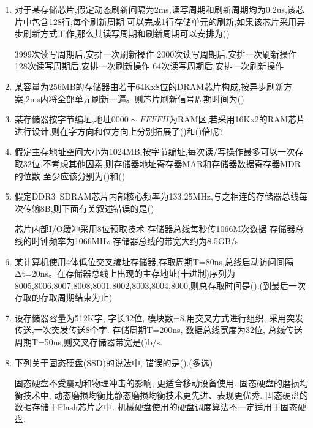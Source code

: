 \documentclass[12pt, a4paper, oneside, UTF8]{ctexbook}
\begin{document}
\begin{enumerate}
    \item  对于某存储芯片,假定动态刷新间隔为2ms,读写周期和刷新周期均为0.2us,该芯片中包含128行,每个刷新周期
    可以完成1行存储单元的刷新,如果该芯片采用异步刷新方式工作,那么其读写周期和刷新周期可以安排为(\qquad)

    \begin{choices}[1]
        \task 3999次读写周期后,安排一次刷新操作
        \task  2000次读写周期后,安排一次刷新操作
        \task 128次读写周期后,安排一次刷新操作
        \task 64次读写周期后,安排一次刷新操作
    \end{choices}

    \item 某容量为256MB的存储器由若干64Kx8位的DRAM芯片构成,按异步刷新方案,2ms内将全部单元刷新一遍。则芯片刷新信号周期时间为(\qquad)
    \item 某存储器按字节编址,地址$0000\sim FFFFH$为RAM区,若采用16Kx2的RAM芯片进行设计,则在字方向和位方向上分别拓展了(\qquad)和(\qquad)倍呢?
    \item 假定主存地址空间大小为1024MB,按字节编址,每次读/写操作最多可以一次存取32位.不考虑其他因素,则存储器地址寄存器MAR和存储器数据寄存器MDR的位数
    至少应该分别为(\qquad)和(\qquad)
    \item 假定DDR3\ SDRAM芯片内部核心频率为133.25MHz,与之相连的存储器总线每次传输8B,则下面有关叙述错误的是(\qquad)
    \begin{choices}[1]
        \task 芯片内部I/O缓冲采用8位预取技术
        \task 存储器总线每秒传1066M次数据
        \task 存储器总线的时钟频率为1066MHz
        \task 存储器总线的带宽大约为8.5GB/s
    \end{choices}
    \item 某计算机使用4体低位交叉编址存储器,存取周期T=80ns,总线启动访问间隔Δt=20ns。在存储器总线上出现的主存地址(十进制)序列为
    8005,8006,8007,8008,8001,8002,8003,8004,8000,则总存取时间是(\qquad).(到最后一次存取的存取周期结束为止)

    \item 设存储器容量为512K字, 字长32位, 模块数=8,用交叉方式进行组织, 采用突发传送,一次突发传送8个字. 存储周期T=200ns,
    数据总线宽度为32位, 总线传送周期T=50ns,则交叉存储器带宽是(\qquad)b/s.

    \item 下列关于固态硬盘(SSD)的说法中, 错误的是(\qquad).(多选)
    \begin{choices}[1]
        \task 固态硬盘不受震动和物理冲击的影响, 更适合移动设备使用.
        \task 固态硬盘的磨损均衡技术中, 动态磨损均衡比静态磨损均衡技术更先进、表现更优秀.
        \task 固态硬盘的数据存储于Flash芯片之中.
        \task 机械硬盘使用的硬盘调度算法不一定适用于固态硬盘.
    \end{choices}


\end{enumerate}
\end{document}
